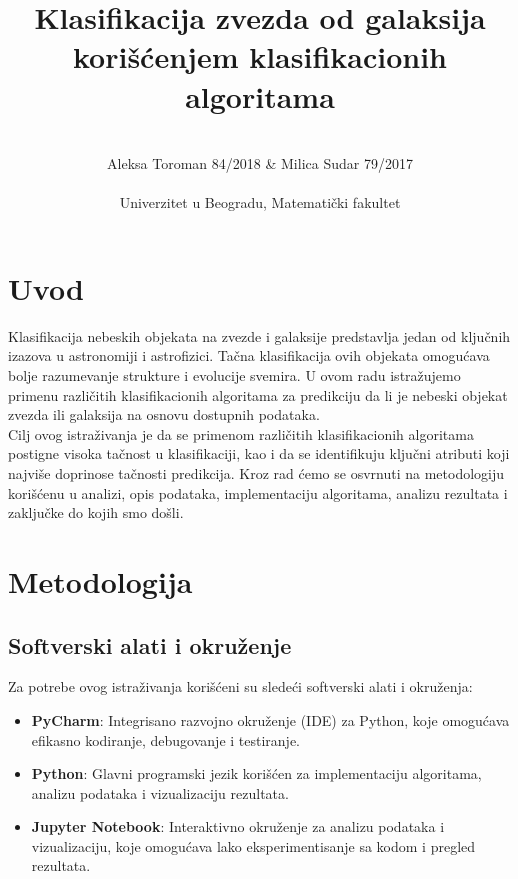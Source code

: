 \documentclass[a4paper,12pt]{article}
\title{Klasifikacija zvezda od galaksija korišćenjem klasifikacionih algoritama}
\author{\\Aleksa Toroman 84/2018 & Milica Sudar 79/2017 \\\\ Univerzitet u Beogradu, Matematički fakultet}
\begin{document}
\maketitle

\newpage
\renewcommand{\contentsname}{Sadržaj}
\tableofcontents

\newpage

\section{Uvod}
Klasifikacija nebeskih objekata na zvezde i galaksije predstavlja jedan od ključnih izazova u astronomiji i astrofizici. Tačna klasifikacija ovih objekata omogućava bolje razumevanje strukture i evolucije svemira. U ovom radu istražujemo primenu različitih klasifikacionih algoritama za predikciju da li je nebeski objekat zvezda ili galaksija na osnovu dostupnih podataka.\\
Cilj ovog istraživanja je da se primenom različitih klasifikacionih algoritama postigne visoka tačnost u klasifikaciji, kao i da se identifikuju ključni atributi koji najviše doprinose tačnosti predikcija. Kroz rad ćemo se osvrnuti na metodologiju korišćenu u analizi, opis podataka, implementaciju algoritama, analizu rezultata i zaključke do kojih smo došli.

\section{Metodologija}
\subsection{Softverski alati i okruženje}
Za potrebe ovog istraživanja korišćeni su sledeći softverski alati i okruženja:
\begin{itemize}
    \item \textbf{PyCharm}: Integrisano razvojno okruženje (IDE) za Python, koje omogućava efikasno kodiranje, debugovanje i testiranje.
    \item \textbf{Python}: Glavni programski jezik korišćen za implementaciju algoritama, analizu podataka i vizualizaciju rezultata.
    \item \textbf{Jupyter Notebook}: Interaktivno okruženje za analizu podataka i vizualizaciju, koje omogućava lako eksperimentisanje sa kodom i pregled rezultata.
\end{itemize}
\end{document}
